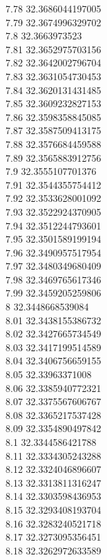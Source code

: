 {7.78	32.3686044197005\\
7.79	32.3674996329702\\
7.8	32.3663973523\\
7.81	32.3652975703156\\
7.82	32.3642002796704\\
7.83	32.3631054730453\\
7.84	32.3620131431485\\
7.85	32.3609232827153\\
7.86	32.3598358845085\\
7.87	32.3587509413175\\
7.88	32.3576684459588\\
7.89	32.3565883912756\\
7.9	32.3555107701376\\
7.91	32.3544355754412\\
7.92	32.3533628001092\\
7.93	32.3522924370905\\
7.94	32.3512244793601\\
7.95	32.3501589199194\\
7.96	32.3490957517954\\
7.97	32.3480349680409\\
7.98	32.3469765617346\\
7.99	32.3459205259806\\
8	32.3448668539084\\
8.01	32.3438155386732\\
8.02	32.3427665734549\\
8.03	32.3417199514589\\
8.04	32.3406756659155\\
8.05	32.33963371008\\
8.06	32.3385940772321\\
8.07	32.3375567606767\\
8.08	32.3365217537428\\
8.09	32.3354890497842\\
8.1	32.3344586421788\\
8.11	32.3334305243288\\
8.12	32.3324046896607\\
8.13	32.3313811316247\\
8.14	32.3303598436953\\
8.15	32.3293408193704\\
8.16	32.3283240521718\\
8.17	32.3273095356451\\
8.18	32.3262972633589\\
}

